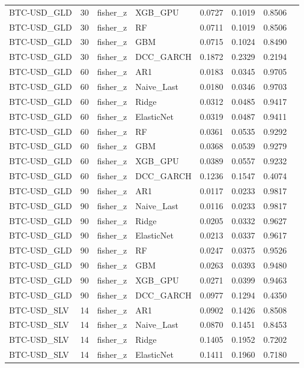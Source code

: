 \begin{table}[H]
\begin{tabular}{llllrrrr}
BTC-USD_GLD & 30 & fisher_z & XGB_GPU & 0.0727 & 0.1019 & 0.8506 &  \\
BTC-USD_GLD & 30 & fisher_z & RF & 0.0711 & 0.1019 & 0.8506 &  \\
BTC-USD_GLD & 30 & fisher_z & GBM & 0.0715 & 0.1024 & 0.8490 &  \\
BTC-USD_GLD & 30 & fisher_z & DCC_GARCH & 0.1872 & 0.2329 & 0.2194 &  \\
BTC-USD_GLD & 60 & fisher_z & AR1 & 0.0183 & 0.0345 & 0.9705 &  \\
BTC-USD_GLD & 60 & fisher_z & Naive_Last & 0.0180 & 0.0346 & 0.9703 &  \\
BTC-USD_GLD & 60 & fisher_z & Ridge & 0.0312 & 0.0485 & 0.9417 &  \\
BTC-USD_GLD & 60 & fisher_z & ElasticNet & 0.0319 & 0.0487 & 0.9411 &  \\
BTC-USD_GLD & 60 & fisher_z & RF & 0.0361 & 0.0535 & 0.9292 &  \\
BTC-USD_GLD & 60 & fisher_z & GBM & 0.0368 & 0.0539 & 0.9279 &  \\
BTC-USD_GLD & 60 & fisher_z & XGB_GPU & 0.0389 & 0.0557 & 0.9232 &  \\
BTC-USD_GLD & 60 & fisher_z & DCC_GARCH & 0.1236 & 0.1547 & 0.4074 &  \\
BTC-USD_GLD & 90 & fisher_z & AR1 & 0.0117 & 0.0233 & 0.9817 &  \\
BTC-USD_GLD & 90 & fisher_z & Naive_Last & 0.0116 & 0.0233 & 0.9817 &  \\
BTC-USD_GLD & 90 & fisher_z & Ridge & 0.0205 & 0.0332 & 0.9627 &  \\
BTC-USD_GLD & 90 & fisher_z & ElasticNet & 0.0213 & 0.0337 & 0.9617 &  \\
BTC-USD_GLD & 90 & fisher_z & RF & 0.0247 & 0.0375 & 0.9526 &  \\
BTC-USD_GLD & 90 & fisher_z & GBM & 0.0263 & 0.0393 & 0.9480 &  \\
BTC-USD_GLD & 90 & fisher_z & XGB_GPU & 0.0271 & 0.0399 & 0.9463 &  \\
BTC-USD_GLD & 90 & fisher_z & DCC_GARCH & 0.0977 & 0.1294 & 0.4350 &  \\
BTC-USD_SLV & 14 & fisher_z & AR1 & 0.0902 & 0.1426 & 0.8508 &  \\
BTC-USD_SLV & 14 & fisher_z & Naive_Last & 0.0870 & 0.1451 & 0.8453 &  \\
BTC-USD_SLV & 14 & fisher_z & Ridge & 0.1405 & 0.1952 & 0.7202 &  \\
BTC-USD_SLV & 14 & fisher_z & ElasticNet & 0.1411 & 0.1960 & 0.7180 &  \\

\end{tabular}
\end{table}

